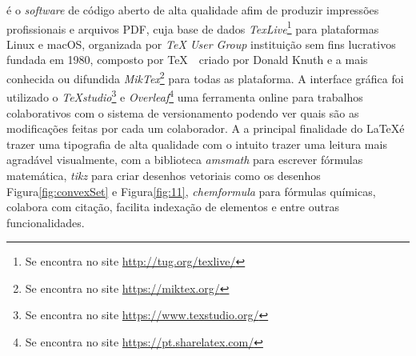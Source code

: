 \LaTeXe  é o \textit{software} de código aberto de alta qualidade afim de produzir impressões profissionais e arquivos PDF, cuja base de dados \textit{TexLive}\footnote{Se encontra no site \url{http://tug.org/texlive/}} para plataformas Linux e macOS, organizada por \textit{TeX User Group} instituição sem fins lucrativos fundada em 1980, composto por \TeX\ \ criado por Donald Knuth e a mais conhecida ou difundida \textit{MikTex}\footnote{Se encontra no site \url{https://miktex.org/}} para todas as plataforma. A interface gráfica foi utilizado o \textit{TeXstudio}\footnote{Se encontra no site \url{https://www.texstudio.org/}} e \textit{Overleaf}\footnote{Se encontra no site \url{https://pt.sharelatex.com/}} uma ferramenta online para trabalhos colaborativos com o sistema de versionamento podendo ver quais são as modificações feitas por cada um colaborador. A a principal finalidade do \LaTeX é trazer uma tipografia de alta qualidade com o intuito trazer uma leitura mais agradável visualmente, com a biblioteca \textit{amsmath} para escrever fórmulas matemática, \textit{tikz} para criar desenhos vetoriais como os desenhos Figura\ref{fig:convexSet} e Figura\ref{fig:11}, \textit{chemformula} para fórmulas químicas, colabora com citação, facilita indexação de elementos e entre outras funcionalidades. \cite{latexchemformula,latexabntex2,latextikz,tex}


